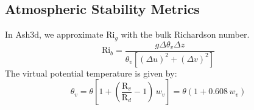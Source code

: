 \subsection{Atmospheric Stability Metrics}
In Ash3d, we approximate $\mathrm{Ri}_g$ with the bulk Richardson number.
\begin{equation}\label{VarDiff_Eq_Rib}
\mathrm{Ri}_b = \frac{g \Delta \theta_v \Delta z}
{\theta_v \left[ \left( \Delta u \right)^2 + \left( \Delta v \right)^2 \right]}
\end{equation}
The virtual potential temperature is given by:
\begin{equation}
\theta_v = \theta \left[ 1 + \left( \frac{\mathrm{R}_{v}}{\mathrm{R}_{d}}-1\right) \, w_v \right] = \theta \left( 1 + 0.608 \, w_v \right)
\end{equation}
